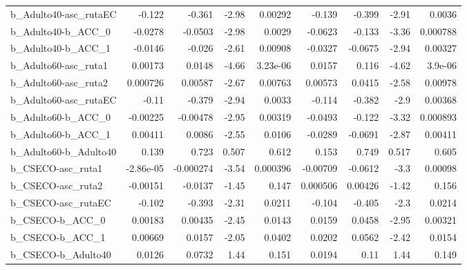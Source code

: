 \begin{tabular}{lrrrrrrrr}
b\_Adulto40-asc\_rutaEC      &      -0.122 &       -0.361 &     -2.98 &  0.00292 &     -0.139 &      -0.399 &        -2.91 &        0.0036 \\
b\_Adulto40-b\_ACC\_0         &     -0.0278 &      -0.0503 &     -2.98 &   0.0029 &    -0.0623 &      -0.133 &        -3.36 &      0.000788 \\
b\_Adulto40-b\_ACC\_1         &     -0.0146 &       -0.026 &     -2.61 &  0.00908 &    -0.0327 &     -0.0675 &        -2.94 &       0.00327 \\
b\_Adulto60-asc\_ruta1       &     0.00173 &       0.0148 &     -4.66 & 3.23e-06 &     0.0157 &       0.116 &        -4.62 &       3.9e-06 \\
b\_Adulto60-asc\_ruta2       &    0.000726 &      0.00587 &     -2.67 &  0.00763 &    0.00573 &      0.0415 &        -2.58 &       0.00978 \\
b\_Adulto60-asc\_rutaEC      &       -0.11 &       -0.379 &     -2.94 &   0.0033 &     -0.114 &      -0.382 &         -2.9 &       0.00368 \\
b\_Adulto60-b\_ACC\_0         &    -0.00225 &     -0.00478 &     -2.95 &  0.00319 &    -0.0493 &      -0.122 &        -3.32 &      0.000893 \\
b\_Adulto60-b\_ACC\_1         &     0.00411 &       0.0086 &     -2.55 &   0.0106 &    -0.0289 &     -0.0691 &        -2.87 &       0.00411 \\
b\_Adulto60-b\_Adulto40      &       0.139 &        0.723 &     0.507 &    0.612 &      0.153 &       0.749 &        0.517 &         0.605 \\
b\_CSECO-asc\_ruta1          &   -2.86e-05 &    -0.000274 &     -3.54 & 0.000396 &   -0.00709 &     -0.0612 &         -3.3 &       0.00098 \\
b\_CSECO-asc\_ruta2          &    -0.00151 &      -0.0137 &     -1.45 &    0.147 &   0.000506 &     0.00426 &        -1.42 &         0.156 \\
b\_CSECO-asc\_rutaEC         &      -0.102 &       -0.393 &     -2.31 &   0.0211 &     -0.104 &      -0.405 &         -2.3 &        0.0214 \\
b\_CSECO-b\_ACC\_0            &     0.00183 &      0.00435 &     -2.45 &   0.0143 &     0.0159 &      0.0458 &        -2.95 &       0.00321 \\
b\_CSECO-b\_ACC\_1            &     0.00669 &       0.0157 &     -2.05 &   0.0402 &     0.0202 &      0.0562 &        -2.42 &        0.0154 \\
b\_CSECO-b\_Adulto40         &      0.0126 &       0.0732 &      1.44 &    0.151 &     0.0194 &        0.11 &         1.44 &         0.149 \\

\end{tabular}
